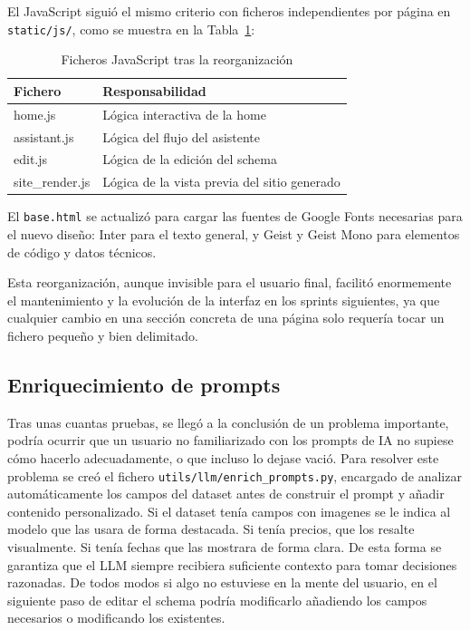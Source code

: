 El JavaScript siguió el mismo criterio con ficheros independientes por página en \texttt{static/js/}, como se muestra en la Tabla~\ref{tab:ficheros-js}:

\begin{table}[H]
    \centering
    \begin{tabular}{|l|p{8cm}|}
        \hline
        \textbf{Fichero} & \textbf{Responsabilidad} \\
        \hline
        home.js & Lógica interactiva de la home \\
        \hline
        assistant.js & Lógica del flujo del asistente \\
        \hline
        edit.js & Lógica de la edición del schema \\
        \hline
        site\_render.js & Lógica de la vista previa del sitio generado \\
        \hline
    \end{tabular}
    \caption{Ficheros JavaScript tras la reorganización}
    \label{tab:ficheros-js}
\end{table}


El \texttt{base.html} se actualizó para cargar las fuentes de Google Fonts 
necesarias para el nuevo diseño: Inter para el texto general, 
y Geist y Geist Mono para elementos de código y datos técnicos.

Esta reorganización, aunque invisible para el usuario final, facilitó enormemente el mantenimiento y la evolución de la interfaz en los sprints siguientes, ya que cualquier cambio en una sección concreta de una página solo requería tocar un fichero pequeño y bien delimitado.


\subsection{Enriquecimiento de prompts}
\label{subsec:enriquecimiento-prompts}

Tras unas cuantas pruebas, se llegó a la conclusión de un problema importante, podría ocurrir que un usuario no familiarizado con los prompts de IA no supiese cómo hacerlo adecuadamente, o que incluso lo dejase vació. Para resolver este problema se creó el fichero \texttt{utils/llm/enrich\_prompts.py}, 
encargado de analizar automáticamente los campos del dataset antes de construir el prompt y añadir contenido personalizado.
Si el dataset tenía campos con imagenes se le indica al modelo que las usara de forma destacada. Si tenía precios, que los resalte visualmente. Si tenía
fechas que las mostrara de forma clara. De esta forma se garantiza que el LLM siempre recibiera suficiente contexto para tomar decisiones razonadas.
De todos modos si algo no estuviese en la mente del usuario, en el siguiente paso de editar el schema podría modificarlo añadiendo los campos necesarios o modificando los existentes.


